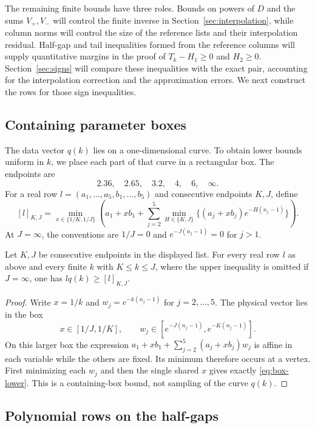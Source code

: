 The remaining finite bounds have three roles.  Bounds on powers of $D$ and
the sums $V_+,V_-$ will control the finite inverse in
Section~\ref{sec:interpolation}, while column norms will control the size of
the reference lists and their interpolation residual.  Half-gap and tail
inequalities formed from the reference columns will supply quantitative
margins in the proof of $T_k-H_1\ge0$ and $H_2\ge0$.
Section~\ref{sec:signs} will compare these inequalities with the exact pair,
accounting for the interpolation correction and the approximation errors.
We next construct the rows for those sign inequalities.

\subsection{Containing parameter boxes}

The data vector $q(k)$ lies on a one-dimensional curve.  To obtain lower
bounds uniform in $k$, we place each part of that curve in a rectangular box.
The endpoints are
\[
 2.36,\quad2.65,\quad3.2,\quad4,\quad6,\quad\infty.
\]
For a real row $l=(a_1,\ldots,a_5,b_1,\ldots,b_5)$ and consecutive
endpoints $K,J$, define
\begin{equation}\label{eq:box-lower}
 [l]_{K,J}=\min_{x\in\{1/K,1/J\}}\left(
 a_1+xb_1+\sum_{j=2}^5
 \min_{H\in\{K,J\}}\{(a_j+xb_j)e^{-H(n_j-1)}\}\right).
\end{equation}
At $J=\infty$, the conventions are $1/J=0$ and
$e^{-J(n_j-1)}=0$ for $j>1$.

\begin{lemma}\label{lem:parameter-box}
Let $K,J$ be consecutive endpoints in the displayed list.  For every real
row $l$ as above and every finite $k$ with $K\le k\le J$,
where the upper inequality is omitted if $J=\infty$, one has
$lq(k)\ge[l]_{K,J}$.
\end{lemma}
\begin{proof}
Write $x=1/k$ and $w_j=e^{-k(n_j-1)}$ for $j=2,\ldots,5$.
The physical vector lies in the box
\[
 x\in[1/J,1/K],\qquad
 w_j\in[e^{-J(n_j-1)},e^{-K(n_j-1)}].
\]
On this larger box the expression
$a_1+xb_1+\sum_{j=2}^5(a_j+xb_j)w_j$ is affine in each variable while
the others are fixed.  Its minimum therefore occurs at a vertex.  First
minimizing each $w_j$ and then the single shared $x$ gives exactly
\eqref{eq:box-lower}.  This is a containing-box bound, not sampling of the
curve $q(k)$.
\end{proof}

\subsection{Polynomial rows on the half-gaps}


